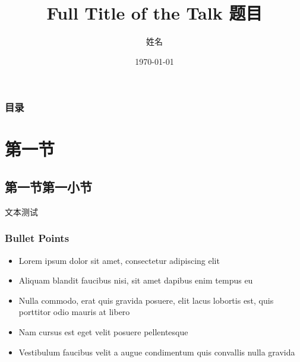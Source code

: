 \documentclass{beamer}
\title[Short 题目]{Full Title of the Talk 题目} %
\author{姓名} %
\institute[大学] %
{
大学全称 \\ %
\medskip
\textit{john@smith.com} %
}
\date{\today} %
\numberwithin{thm}{section}
\numberwithin{defn}{section}
\numberwithin{lmm}{section}
\theoremstyle{example}
\numberwithin{figure}{section}
\numberwithin{table}{section}
\numberwithin{equation}{section}
\begin{document}
\songti

\begin{frame}
\titlepage %
\end{frame}

\begin{frame}
\frametitle{目录} %
\tableofcontents %
\end{frame}


\section{第一节} %

\subsection{第一节第一小节} %

\begin{frame}{文本测试}
\zhlipsum[1]
\end{frame}


\begin{frame}
\frametitle{Bullet Points}
\begin{itemize}
\item Lorem ipsum dolor sit amet, consectetur adipiscing elit
\item Aliquam blandit faucibus nisi, sit amet dapibus enim tempus eu
\item Nulla commodo, erat quis gravida posuere, elit lacus lobortis est, quis porttitor odio mauris at libero
\item Nam cursus est eget velit posuere pellentesque
\item Vestibulum faucibus velit a augue condimentum quis convallis nulla gravida
\end{itemize}
\end{frame}
\end{document}
